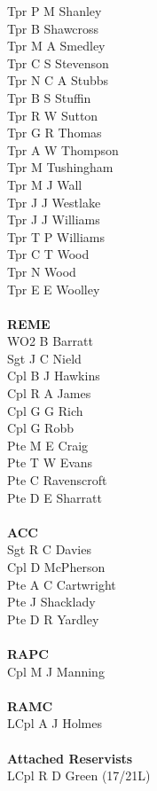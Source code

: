 \begin{multicols}{4}
  Tpr P M Shanley \\
  Tpr B Shawcross \\
  Tpr M A Smedley \\
  Tpr C S Stevenson \\
  Tpr N C A Stubbs \\
  Tpr B S Stuffin \\
  Tpr R W Sutton \\
  Tpr G R Thomas \\
  Tpr A W Thompson \\
  Tpr M Tushingham \\
  Tpr M J Wall \\
  Tpr J J Westlake \\
  Tpr J J Williams \\
  Tpr T P Williams \\
  Tpr C T Wood \\
  Tpr N Wood \\
  Tpr E E Woolley \\
  \\
  \textbf{REME} \\
  WO2 B Barratt \\
  Sgt J C Nield \\
  Cpl B J Hawkins \\
  Cpl R A James \\
  Cpl G G Rich \\
  Cpl G Robb \\
  Pte M E Craig \\
  Pte T W Evans \\
  Pte C Ravenscroft \\
  Pte D E Sharratt \\
  \\
  \textbf{ACC} \\
  Sgt R C Davies \\
  Cpl D McPherson \\
  Pte A C Cartwright \\
  Pte J Shacklady \\
  Pte D R Yardley \\
  \\
  \textbf{RAPC} \\
  Cpl M J Manning \\
  \\
  \textbf{RAMC} \\
  LCpl A J Holmes \\
  \\
  \textbf{Attached Reservists} \\
  LCpl R D Green (17/21L) \\

\end{multicols}
